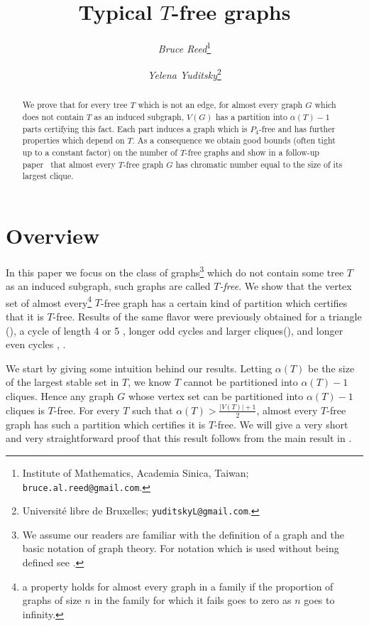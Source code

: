 \documentclass[12pt]{article}
\title{Typical $T$-free graphs}
\author{
{\sl Bruce Reed}\thanks{Institute of Mathematics, Academia Sinica, Taiwan; \texttt{bruce.al.reed@gmail.com}.} \and
{\sl Yelena Yuditsky}\thanks{Université libre de Bruxelles; \texttt{yuditskyL@gmail.com}.}
}
\theoremstyle{definition}
\begin{document}
\maketitle

\begin{abstract} 
We prove that for every tree $T$ which is not an edge, for almost every graph $G$ which does not contain $T$ as an induced subgraph, $V(G)$ has a partition into $\alpha(T)-1$ parts certifying this fact. Each part induces a graph which is $P_4$-free and has further properties which depend on $T$. As a consequence we obtain good bounds (often tight up to a constant factor) on the number of
$T$-free graphs and show in a follow-up paper~\cite{RY} that almost every $T$-free graph $G$ has chromatic number equal to the size of its largest clique.
\end{abstract}


\section{Overview}

In this paper we focus on the class of graphs\footnote{We assume our readers are familiar with the definition of a graph and the basic notation of graph theory. For notation which is used without being defined see \cite{BMbook}.} which do not contain some tree $T$ as an induced subgraph, such graphs are called \textit{$T$-free}. We show that the vertex set of almost every\footnote{a property holds for almost every graph in a family if the proportion of graphs of size $n$ in the family for which it fails goes to zero as $n$ goes to infinity.} $T$-free graph  has a certain kind of  partition which certifies that it is $T$-free. Results of the same flavor were previously obtained for a triangle (\cite{EKR76}), a cycle of length 4 or 5 \cite{PS91,PSBerge}, longer odd cycles and larger cliques(\cite{BB11,KPR87}), and longer even cycles \cite{R}, \cite{KKOT15} .

We start by giving some intuition behind our results. Letting $\alpha(T)$ be the size of the largest stable set in $T$, we know  $T$ cannot be partitioned into $\alpha(T)-1$ cliques. Hence any graph $G$ whose vertex set can be partitioned into $\alpha(T)-1$ cliques is $T$-free.  For every $T$ such that $\alpha(T)>\frac{|V(T)|+1}{2}$, almost every $T$-free graph 
has such a partition  which certifies it is $T$-free. We will give a very short and very straightforward proof that this 
result follows from the main result in \cite{BB11}. 
\end{document}
